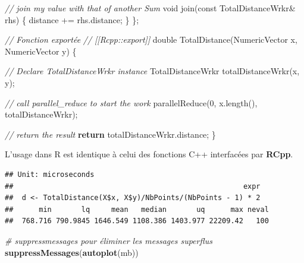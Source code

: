 \documentclass[
  12pt,
  french,
  a4paper,
  extrafontsizes,onecolumn,openright
  ]{memoir}
\newenvironment{Shaded}{\begin{snugshade}}{\end{snugshade}}
\newcommand{\AttributeTok}[1]{\textcolor[rgb]{0.77,0.63,0.00}{#1}}
\newcommand{\CommentTok}[1]{\textcolor[rgb]{0.56,0.35,0.01}{\textit{#1}}}
\newcommand{\ControlFlowTok}[1]{\textcolor[rgb]{0.13,0.29,0.53}{\textbf{#1}}}
\newcommand{\DataTypeTok}[1]{\textcolor[rgb]{0.13,0.29,0.53}{#1}}
\newcommand{\DecValTok}[1]{\textcolor[rgb]{0.00,0.00,0.81}{#1}}
\newcommand{\KeywordTok}[1]{\textcolor[rgb]{0.13,0.29,0.53}{\textbf{#1}}}
\newcommand{\NormalTok}[1]{#1}
\newcommand{\OperatorTok}[1]{\textcolor[rgb]{0.81,0.36,0.00}{\textbf{#1}}}
\newcommand{\StringTok}[1]{\textcolor[rgb]{0.31,0.60,0.02}{#1}}
\newlength{\rf}
\begin{document}
\begin{Shaded}
\begin{Highlighting}[]
  \CommentTok{// join my value with that of another Sum}
  \DataTypeTok{void}\NormalTok{ join(}\AttributeTok{const}\NormalTok{ TotalDistanceWrkr& rhs) \{ }
\NormalTok{    distance += rhs.distance; }
\NormalTok{  \}}
\NormalTok{\};}


\CommentTok{// Fonction exportée}
\CommentTok{// [[Rcpp::export]]}
\DataTypeTok{double}\NormalTok{ TotalDistance(NumericVector x, NumericVector y) \{}
  
  \CommentTok{// Declare TotalDistanceWrkr instance}
\NormalTok{  TotalDistanceWrkr totalDistanceWrkr(x, y);}
  
  \CommentTok{// call parallel_reduce to start the work}
\NormalTok{  parallelReduce(}\DecValTok{0}\NormalTok{, x.length(), totalDistanceWrkr);}
  
  \CommentTok{// return the result}
  \ControlFlowTok{return}\NormalTok{ totalDistanceWrkr.distance;}
\NormalTok{\}}
\end{Highlighting}
\end{Shaded}

\normalsize

L'usage dans R est identique à celui des fonctions C++ interfacées par \textbf{RCpp}.

\scriptsize

\begin{Shaded}
\end{Shaded}

\begin{verbatim}
## Unit: microseconds
##                                                      expr
##  d <- TotalDistance(X$x, X$y)/NbPoints/(NbPoints - 1) * 2
##      min       lq     mean   median       uq      max neval
##  768.716 790.9845 1646.549 1108.386 1403.977 22209.42   100
\end{verbatim}

\begin{Shaded}
\begin{Highlighting}[]
\CommentTok{# suppressmessages pour éliminer les messages superflus}
\KeywordTok{suppressMessages}\NormalTok{(}\KeywordTok{autoplot}\NormalTok{(mb))}
\end{Highlighting}
\end{Shaded}
\end{document}
